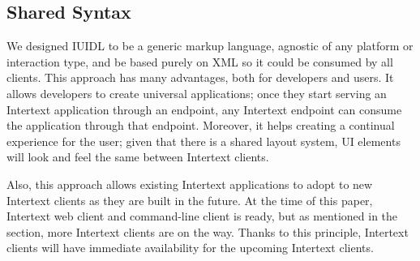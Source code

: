 \subsection{Shared Syntax}

We designed IUIDL to be a generic markup language, agnostic of any platform or interaction type, and be based purely on XML so it could be consumed by all clients. This approach has many advantages, both for developers and users. It allows developers to create universal applications; once they start serving an Intertext application through an endpoint, any Intertext endpoint can consume the application through that endpoint. Moreover, it helps creating a continual experience for the user; given that there is a shared layout system, UI elements will look and feel the same between Intertext clients.

Also, this approach allows existing Intertext applications to adopt to new Intertext clients as they are built in the future. At the time of this paper, Intertext web client and command-line client is ready, but as mentioned in the  section, more Intertext clients are on the way. Thanks to this principle, Intertext clients will have immediate availability for the upcoming Intertext clients.
